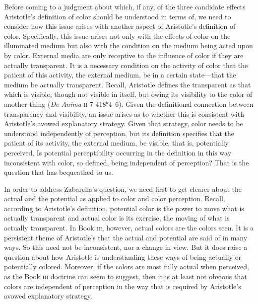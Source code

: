 Before coming to a judgment about which, if any, of the three candidate effects Aristotle's definition of color should be understood in terms of, we need to consider how this issue arises with another aspect of Aristotle's definition of color. Specifically, this issue arises not only with the effects of color on the illuminated medium but also with the condition on the medium being acted upon by color. External media are only receptive to the influence of color if they are actually transparent. It is a necessary condition on the activity of color that the patient of this activity, the external medium, be in a certain state---that the medium be actually transparent. Recall, Aristotle defines the transparent as that which is visible, though not visible in itself, but owing its visibility to the color of another thing (\emph{De Anima} \textsc{ii} 7 418\( ^{b} \)4--6). Given the definitional connection between transparency and visibility, an issue arises as to whether this is consistent with Aristotle's avowed explanatory strategy. Given that strategy, color needs to be understood independently of perception, but its definition specifies that the patient of its activity, the external medium, be visible, that is, potentially perceived. Is potential perceptibility occurring in the definition in this way inconsistent with color, so defined, being independent of perception? That is the question that \citet{Zabarella:1605kx} has bequeathed to us.

In order to address Zabarella's question, we need first to get clearer about the actual and the potential as applied to color and color perception. Recall, according to Aristotle's definition, potential color is the power to move what is actually transparent and actual color is its exercise, the moving of what is actually transparent. In Book \textsc{iii}, however, actual colors are the colors seen. It is a persistent theme of Aristotle's that the actual and potential are said of in many ways. So this need not be inconsistent, nor a change in view. But it does raise a question about how Aristotle is understanding these ways of being actually or potentially colored. Moreover, if the colors are most fully actual when perceived, as the Book \textsc{iii} doctrine can seem to suggest, then it is at least not obvious that colors are independent of perception in the way that is required by Aristotle's avowed explanatory strategy.

